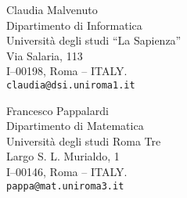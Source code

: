 \documentclass[a4paper,twoside]{article}
\begin{document}
\begin{footnotesize}
\noindent Claudia Malvenuto\\
Dipartimento di Informatica\\
Universit\`a degli studi ``La Sapienza''\\
Via Salaria, 113\\
I--00198, Roma -- ITALY.\\
\texttt{claudia@dsi.uniroma1.it}
\bigskip

\noindent Francesco Pappalardi\\
Dipartimento di Matematica\\
Universit\`a degli studi Roma Tre\\
Largo S. L. Murialdo, 1\\
I--00146, Roma -- ITALY.\\
\texttt{pappa@mat.uniroma3.it}
\end{footnotesize}

\vfill
\end{document}
